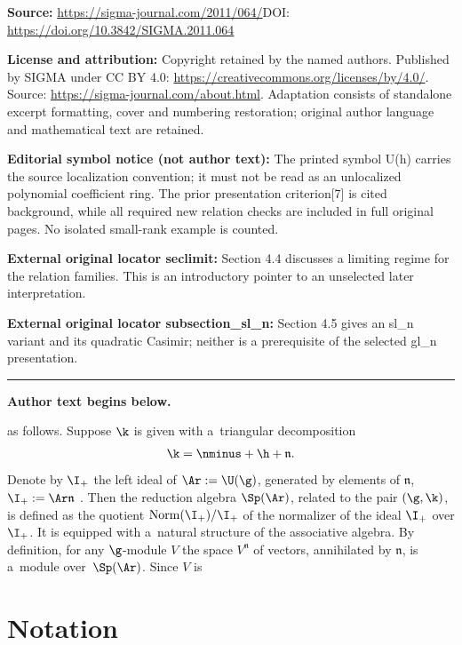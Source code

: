 \documentclass[11pt]{article}
\def\nplus{\mathfrak{n}}\def\nn{\nonumber}\def\nin{\noindent}
\numberwithin{equation}{section}
\begin{document}
\noindent\textbf{Source:} \url{https://sigma-journal.com/2011/064/}\quad DOI: \url{https://doi.org/10.3842/SIGMA.2011.064}\par
\noindent\textbf{License and attribution:} Copyright retained by the named authors. Published by SIGMA under CC BY 4.0: \url{https://creativecommons.org/licenses/by/4.0/}. Source: \url{https://sigma-journal.com/about.html}. Adaptation consists of standalone excerpt formatting, cover and numbering restoration; original author language and mathematical text are retained.\par
\noindent\textbf{Editorial symbol notice (not author text):} The printed symbol U(h) carries the source localization convention; it must not be read as an unlocalized polynomial coefficient ring. The prior presentation criterion[7] is cited background, while all required new relation checks are included in full original pages. No isolated small-rank example is counted.\par
\noindent\textbf{External original locator seclimit:} Section 4.4 discusses a limiting regime for the relation families. This is an introductory pointer to an unselected later interpretation.\par
\noindent\textbf{External original locator subsection\_sl\_n:} Section 4.5 gives an sl\_n variant and its quadratic Casimir; neither is a prerequisite of the selected gl\_n presentation.\par
\medskip\hrule\medskip\noindent\textbf{Author text begins below.}\par
\setcounter{section}{1}
\setcounter{subsection}{0}
\setcounter{subsubsection}{0}
\setcounter{equation}{1}
as follows. Suppose $\k$ is given with  a~triangular decomposition
\begin{gather}
\label{intro1} \k=\nminus+\h+\nplus  .
\end{gather}
Denote by $\I_+$ the left ideal of $\Ar :=\U(\g)$, generated by elements of $\nplus$, $\I_+ :=\Ar\nplus$ . Then the reduction algebra $\Sp(\Ar)$, related to the pair
$(\g,\k)$, is def\/ined as the quotient $\mathrm{Norm}(\I_+)/\I_+$ of the normalizer of the ideal $\I_+$ over $\I_+$. It is equipped with a~natural structure of the
associative algebra.  By def\/inition, for any $\g$-module $V$ the space $V^\nplus$ of vectors, annihilated by $\nplus$, is a~module over~$\Sp(\Ar)$. Since $V$ is
\setcounter{section}{1}
\setcounter{subsection}{0}
\setcounter{subsubsection}{0}
\setcounter{equation}{2}
\section{Notation}\label{section-notation}
\end{document}
